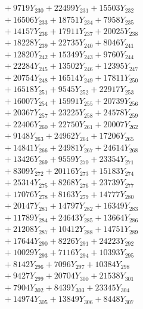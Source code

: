 \documentclass[a4paper,10pt]{article}
\begin{document}
{\begin{align}
&\;  + 9719 Y_{230} + 22499 Y_{231} + 15503 Y_{232} \\[0.3ex]
&\;  + 16506 Y_{233} + 18751 Y_{234} + 7958 Y_{235} \\[0.3ex]
&\;  + 14157 Y_{236} + 17911 Y_{237} + 20025 Y_{238} \\[0.5ex]\allowbreak
&\;  + 18228 Y_{239} + 22735 Y_{240} + 8046 Y_{241} \\[0.3ex]
&\;  + 12820 Y_{242} + 15349 Y_{243} + 9760 Y_{244} \\[0.3ex]
&\;  + 22284 Y_{245} + 13502 Y_{246} + 12395 Y_{247} \\[0.3ex]
&\;  + 20754 Y_{248} + 16514 Y_{249} + 17811 Y_{250} \\[0.3ex]
&\;  + 16518 Y_{251} + 9545 Y_{252} + 22917 Y_{253} \\[0.3ex]
&\;  + 16007 Y_{254} + 15991 Y_{255} + 20739 Y_{256} \\[0.3ex]
&\;  + 20367 Y_{257} + 23225 Y_{258} + 24578 Y_{259} \\[0.3ex]
&\;  + 22406 Y_{260} + 22750 Y_{261} + 20007 Y_{262} \\[0.3ex]
&\;  + 9148 Y_{263} + 24962 Y_{264} + 17206 Y_{265} \\[0.3ex]
&\;  + 14841 Y_{266} + 24981 Y_{267} + 24614 Y_{268} \\[0.5ex]\allowbreak
&\;  + 13426 Y_{269} + 9559 Y_{270} + 23354 Y_{271} \\[0.3ex]
&\;  + 8309 Y_{272} + 20116 Y_{273} + 15183 Y_{274} \\[0.3ex]
&\;  + 25314 Y_{275} + 8268 Y_{276} + 23739 Y_{277} \\[0.3ex]
&\;  + 17076 Y_{278} + 8163 Y_{279} + 14777 Y_{280} \\[0.3ex]
&\;  + 20147 Y_{281} + 14797 Y_{282} + 16349 Y_{283} \\[0.3ex]
&\;  + 11789 Y_{284} + 24643 Y_{285} + 13664 Y_{286} \\[0.3ex]
&\;  + 21208 Y_{287} + 10412 Y_{288} + 14751 Y_{289} \\[0.3ex]
&\;  + 17644 Y_{290} + 8226 Y_{291} + 24223 Y_{292} \\[0.3ex]
&\;  + 10029 Y_{293} + 7116 Y_{294} + 10393 Y_{295} \\[0.3ex]
&\;  + 8142 Y_{296} + 7096 Y_{297} + 10384 Y_{298} \\[0.5ex]\allowbreak
&\;  + 9427 Y_{299} + 20704 Y_{300} + 21538 Y_{301} \\[0.3ex]
&\;  + 7904 Y_{302} + 8439 Y_{303} + 23345 Y_{304} \\[0.3ex]
&\;  + 14974 Y_{305} + 13849 Y_{306} + 8448 Y_{307} \\[0.3ex]

\end{align}}
\end{document}
